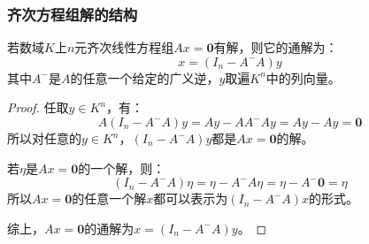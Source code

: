 \subsubsection{齐次方程组解的结构}
\begin{theorem}\label{theo:HomogeneousLinearEq'sGeneralSolution}
	若数域$K$上$n$元齐次线性方程组$Ax=\mathbf{0}$有解，则它的通解为：
	\begin{equation*}
		x=(I_n-A^-A)y
	\end{equation*}
	其中$A^-$是$A$的任意一个给定的广义逆，$y$取遍$K^n$中的列向量。
\end{theorem}
\begin{proof}
	任取$y\in K^n$，有：
	\begin{equation*}
		A(I_n-A^-A)y=Ay-AA^-Ay=Ay-Ay=\mathbf{0}
	\end{equation*}
	所以对任意的$y\in K^n$，$(I_n-A^-A)y$都是$Ax=\mathbf{0}$的解。\par
	若$\eta$是$Ax=\mathbf{0}$的一个解，则：
	\begin{equation*}
		(I_n-A^-A)\eta=\eta-A^-A\eta=\eta-A^-\mathbf{0}=\eta
	\end{equation*}
	所以$Ax=\mathbf{0}$的任意一个解$x$都可以表示为$(I_n-A^-A)x$的形式。\par
	综上，$Ax=\mathbf{0}$的通解为$x=(I_n-A^-A)y$。
\end{proof}
